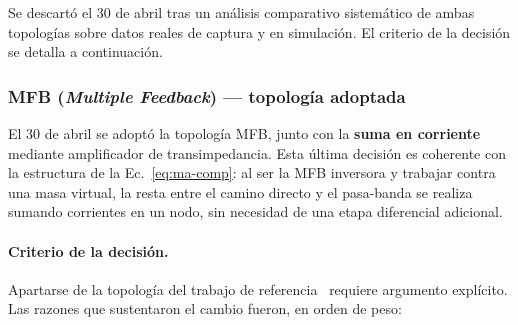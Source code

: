 Se descart\'o el 30 de abril tras un an\'alisis comparativo sistem\'atico de ambas
topolog\'ias sobre datos reales de captura y en simulaci\'on. El criterio de la
decisi\'on se detalla a continuaci\'on.

\subsubsection{MFB (\emph{Multiple Feedback}) --- topolog\'ia adoptada}

El 30 de abril se adopt\'o la topolog\'ia MFB, junto con la \textbf{suma en corriente}
mediante amplificador de transimpedancia. Esta \'ultima decisi\'on es coherente con la
estructura de la Ec.~\eqref{eq:ma-comp}: al ser la MFB inversora y trabajar contra una
masa virtual, la resta entre el camino directo y el pasa-banda se realiza sumando
corrientes en un nodo, sin necesidad de una etapa diferencial adicional.

\paragraph{Criterio de la decisi\'on.} Apartarse de la topolog\'ia del trabajo de
referencia~\cite{Ma2023} requiere argumento expl\'icito. Las razones que sustentaron el
cambio fueron, en orden de peso:


